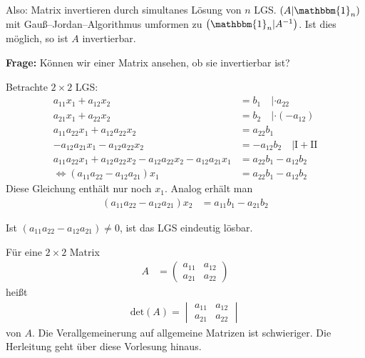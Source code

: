 Also: Matrix invertieren durch simultanes Lösung von $n$ LGS. $\left(A|\mathbbm{1}_n\right)$ mit Gauß--Jordan--Algorithmus umformen zu $\left(\mathbbm{1}_n|A^{-1}\right)$. Ist dies möglich, so ist $A$ invertierbar.

\vspace{0.5cm}

\textbf{Frage:} Können wir einer Matrix \glqq{}ansehen\grqq{}, ob sie invertierbar ist?

Betrachte $2 \times 2$ LGS:
\begin{align*}
	a_{11}x_1 + a_{12}x_2 &= b_1\quad |\cdot a_{22} \\
	a_{21}x_1 + a_{22}x_2 &= b_2\quad |\cdot (-a_{12}) \\[0.5cm]
	a_{11}a_{22}x_1 + a_{12}a_{22}x_2 &= a_{22}b_1 \\
	-a_{12}a_{21}x_1 - a_{12}a_{22}x_2 &= -a_{12}b_2 \quad |\text{I} + \text{II} \\[0.5cm]
	a_{11}a_{22}x_1 + a_{12}a_{22}x_2 - a_{12}a_{22}x_2 - a_{12}a_{21}x_1 &= a_{22}b_1 - a_{12}b_2 \\
	\Leftrightarrow (a_{11}a_{22}-a_{12}a_{21}) x_1 &= a_{22}b_1 - a_{12}b_{2}
\end{align*}
Diese Gleichung enthält nur noch $x_1$. Analog erhält man
\begin{align*}
	(a_{11}a_{22}-a_{12}a_{21}) x_2 &= a_{11}b_1 - a_{21}b_{2}
\end{align*}

Ist $(a_{11}a_{22}-a_{12}a_{21}) \neq 0$, ist das LGS eindeutig lösbar.

Für eine $2 \times 2$ Matrix
\begin{align*}
    A &= \begin{pmatrix}a_{11} & a_{12} \\ a_{21} & a_{22}\end{pmatrix}
\end{align*}
heißt
\begin{align*}
    \text{det}(A) = \begin{vmatrix}a_{11} & a_{12} \\ a_{21} & a_{22}\end{vmatrix}
\end{align*}
 von $A$. Die Verallgemeinerung auf allgemeine Matrizen ist schwieriger. Die Herleitung geht über diese Vorlesung hinaus.

